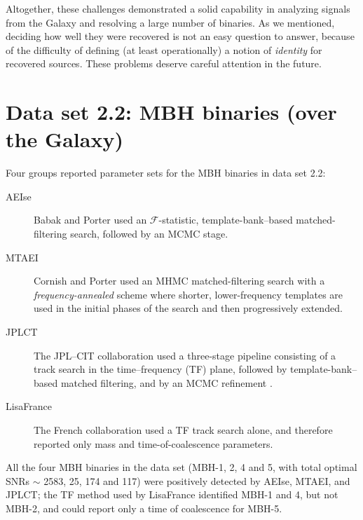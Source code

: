 \documentclass{iopart}
\begin{document}
Altogether, these challenges demonstrated a solid capability in analyzing signals from the Galaxy and resolving a large number of binaries. As we mentioned, deciding how well they were recovered is not an easy question to answer, because of the difficulty of defining (at least operationally) a notion of \emph{identity} for recovered sources. These problems deserve careful attention in the future.

\section{Data set 2.2: MBH binaries (over the Galaxy)}

Four groups reported parameter sets for the MBH binaries in data set 2.2:
\begin{description} 
\item[AEIse] Babak and Porter used an $\mathcal{F}$-statistic, template-bank--based matched-filtering search, followed by an MCMC stage.
\item[MTAEI] Cornish and Porter used an MHMC matched-filtering search with a \emph{frequency-annealed} scheme where shorter, lower-frequency templates are used in the initial phases of the search and then progressively extended.
\item[JPLCT] The JPL--CIT collaboration used a three-stage pipeline consisting of a track search in the time--frequency (TF) plane, followed by template-bank--based matched filtering, and by an MCMC refinement \cite{brown}.
\item[LisaFrance] The French collaboration used a TF track search alone, and therefore reported only mass and time-of-coalescence parameters.
\end{description}
All the four MBH binaries in the data set (MBH-1, 2, 4 and 5, with total optimal SNRs $\sim$ 2583, 25, 174 and 117) were positively detected by AEIse, MTAEI, and JPLCT; the TF method used by LisaFrance identified MBH-1 and 4, but not MBH-2, and could report only a time of coalescence for MBH-5.
%
\end{document}
